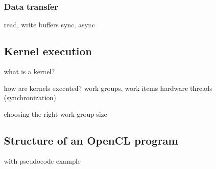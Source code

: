 \subsubsection{Data transfer}
read, write buffers
sync, async

\subsection{Kernel execution}
what is a kernel?

how are kernels executed?
work groups, work items
hardware threads (synchronization)

choosing the right work group size

\subsection{Structure of an OpenCL program}

with pseudocode example

